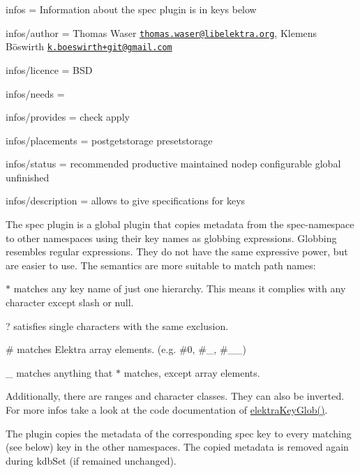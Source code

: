 
\begin{DoxyItemize}
\item infos = Information about the spec plugin is in keys below
\item infos/author = Thomas Waser \href{mailto:thomas.waser@libelektra.org}{\tt thomas.\+waser@libelektra.\+org}, Klemens Böswirth \href{mailto:k.boeswirth+git@gmail.com}{\tt k.\+boeswirth+git@gmail.\+com}
\item infos/licence = B\+SD
\item infos/needs =
\item infos/provides = check apply
\item infos/placements = postgetstorage presetstorage
\item infos/status = recommended productive maintained nodep configurable global unfinished
\item infos/description = allows to give specifications for keys
\end{DoxyItemize}

The spec plugin is a global plugin that copies metadata from the {\ttfamily spec}-\/namespace to other namespaces using their key names as globbing expressions. Globbing resembles regular expressions. They do not have the same expressive power, but are easier to use. The semantics are more suitable to match path names\+:


\begin{DoxyItemize}
\item {\ttfamily $\ast$} matches any key name of just one hierarchy. This means it complies with any character except slash or null.
\item {\ttfamily ?} satisfies single characters with the same exclusion.
\item {\ttfamily \#} matches Elektra array elements. (e.\+g. {\ttfamily \#0}, {\ttfamily \#\+\_}, {\ttfamily \#\+\_\+\+\_})
\item {\ttfamily \+\_\+} matches anything that {\ttfamily $\ast$} matches, except array elements.
\item Additionally, there are ranges and character classes. They can also be inverted. For more infos take a look at the code documentation of {\ttfamily \hyperlink{globbing_8c_ad7700821df72fc0fc3bfc336e4368d29}{elektra\+Key\+Glob()}}.
\end{DoxyItemize}

The plugin copies the metadata of the corresponding {\ttfamily spec} key to every matching (see below) key in the other namespaces. The copied metadata is removed again during {\ttfamily kdb\+Set} (if remained unchanged).

